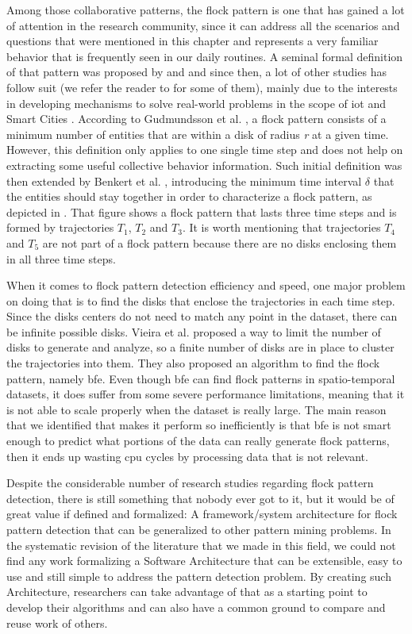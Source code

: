 Among those collaborative patterns, the flock pattern is one that has gained a lot of attention in the research
community, since it can address all the scenarios and questions that were mentioned in this chapter and represents a
very familiar behavior that is frequently seen in our daily routines. A seminal formal definition of that pattern was
proposed by \citep{remo} and \citep{gudefficient} and since then, a lot of other studies has follow suit (we refer the
reader to  for some of them), mainly due to the interests in developing mechanisms to solve
real-world problems in the scope of \ac{iot} \citep{iot} and Smart Cities \citep{smartcities}. According to Gudmundsson
et al. \citep{gudefficient}, a flock pattern consists of a minimum number of entities that are within a disk of radius
\textit{r} at a given time.  However, this definition only applies to one single time step and does not help on
extracting some useful collective behavior information. Such initial definition was then extended by Benkert et al.
\citep{gudreportingflock}, introducing the minimum time interval $\delta$ that the entities should stay together in
order to characterize a flock pattern, as depicted in . That figure shows a flock pattern that lasts
three time steps and is formed by trajectories $T_1$, $T_2$ and $T_3$. It is worth mentioning that trajectories $T_4$
and $T_5$ are not part of a flock pattern because there are no disks enclosing them in all three time steps.

When it comes to flock pattern detection efficiency and speed, one major problem on doing that is to find the disks that
enclose the trajectories in each time step. Since the disks centers do not need to match any point in the dataset, there
can be infinite possible disks. Vieira et al. \citep{vieira} proposed a way to limit the number of disks to generate and
analyze, so a finite number of disks are in place to cluster the trajectories into them. They also proposed an algorithm
to find the flock pattern, namely \ac{bfe}. Even though \ac{bfe} can find flock patterns in spatio-temporal datasets, it
does suffer from some severe performance limitations, meaning that it is not able to scale properly when the dataset is
really large. The main reason that we identified that makes it perform so inefficiently is that \ac{bfe} is not smart
enough to predict what portions of the data can really generate flock patterns, then it ends up wasting \ac{cpu} cycles
by processing data that is not relevant.

Despite the considerable number of research studies regarding flock pattern detection, there is still something that
nobody ever got to it, but it would be of great value if defined and formalized: A framework/system architecture for
flock pattern detection that can be generalized to other pattern mining problems. In the systematic revision of the
literature that we made in this field, we could not find any work formalizing a Software Architecture that can be
extensible, easy to use and still simple to address the pattern detection problem. By creating such Architecture,
researchers can take advantage of that as a starting point to develop their algorithms and can also have a common ground
to compare and reuse work of others.

